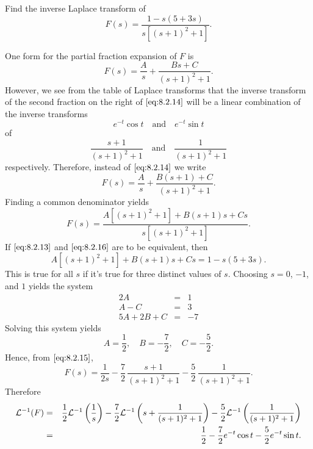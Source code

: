 \documentclass{ximera}
\begin{document}
\begin{example}\label{example:8.2.8} %
 Find the inverse Laplace transform of
\begin{equation}\label{eq:8.2.13}
F(s)=\frac{1-s(5+3s)}{s\left[(s+1)^2+1\right]}.
\end{equation}
\begin{explanation}
One  form for the partial fraction expansion of $F$ is
\begin{equation}\label{eq:8.2.14}
F(s)=\frac{A}{s}+\frac{Bs+C}{(s+1)^2+1}.
\end{equation}
However, we see from the table of Laplace transforms that the inverse
transform of the second fraction on the right of $\eqref{eq:8.2.14}$ will be
a linear combination of the inverse transforms
$$
e^{-t}\cos t\quad\mbox{and}\quad e^{-t}\sin t
$$
of
$$
\frac{s+1}{(s+1)^2+1}\quad\mbox{and}\quad \frac{1}{(s+1)^2+1}
$$
respectively. Therefore, instead of $\eqref{eq:8.2.14}$ we write
\begin{equation}\label{eq:8.2.15}
F(s)=\frac{A}{s}+\frac{B(s+1)+C}{(s+1)^2+1}.
\end{equation}
Finding a common denominator yields
\begin{equation}\label{eq:8.2.16}
F(s)=\frac{A\left[(s+1)^2+1\right]+B(s+1)s+Cs}{s\left[(s+1)^2+1\right]}.
\end{equation}
If $\eqref{eq:8.2.13}$ and  $\eqref{eq:8.2.16}$ are to be equivalent, then
$$
A\left[(s+1)^2+1\right]+B(s+1)s+Cs=1-s(5+3s).
$$
This is true for all $s$ if it's true for three distinct values of
$s$.  Choosing $s=0$, $-1$, and $1$ yields the system
$$
\begin{array}{rcr}
2A&=&1\\ A-C&=&3\\5A+2B+C&=&-7
\end{array}
$$
Solving this system yields
$$
A=\frac{1}{2},\quad B=-\frac{7}{2},\quad C=-\frac{5}{2}.
$$
Hence, from $\eqref{eq:8.2.15}$,
$$
F(s)=\frac{1}{2s}-\frac{7}{2}\,\frac{s+1}{(s+1)^2+1}-
\frac{5}{2}\,\frac{1}{(s+1)^2+1}.
$$
Therefore
\begin{eqnarray*}
{\cal L}^{-1}(F)&=&
\frac{1}{2}{\cal L}^{-1}\left(\frac{1}{s}\right)-{\frac{7}{2}}{\cal
L}^{-1}\left(s+\frac{1
}{(s+1)^2+1}\right)-\frac{5}{2} {\cal L}^{-1}\left(\frac{1}{(s+1)^2+1}\right)\\
&=& {\frac{1}{2}}-{\frac{7}{2}}e^{-t}\cos t-{\frac{5}{2}}e^{-t}\sin t.
\end{eqnarray*}
\end{explanation}
\end{example}
\end{document}
